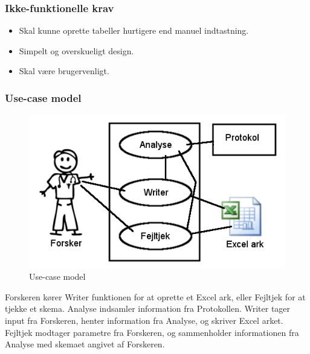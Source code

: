 \documentclass[11pt]{article}
\begin{document}
\subsubsection{Ikke-funktionelle krav}
\begin{itemize}
  \item Skal kunne oprette tabeller hurtigere end manuel indtastning.
  \item Simpelt og overskueligt design.
  \item Skal være brugervenligt.
\end{itemize}
\pagebreak
\subsubsection{Use-case model}
\begin{figure}[H]
\includegraphics[scale=0.5]{usecase.png}
\caption{Use-case model}
\end{figure}
Forskeren kører Writer funktionen for at oprette et Excel ark,
eller Fejltjek for at tjekke et skema.
Analyse indsamler information fra Protokollen.
Writer tager input fra Forskeren, henter information fra Analyse, og skriver Excel arket. Fejltjek modtager parametre fra Forskeren, og sammenholder informationen fra Analyse med skemaet angivet af Forskeren.
\end{document}
